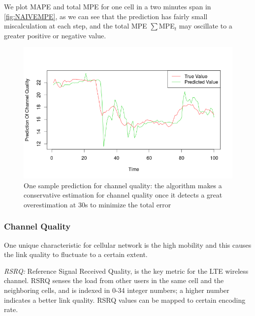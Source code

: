 We plot MAPE and total MPE for one cell in a two minutes span in \autoref{fig:NAIVEMPE}, as we can see that the prediction has fairly small miscalculation at each step, and the total MPE $\sum$MPE$_t$ may oscillate to a greater positive or negative value. 
\begin{figure}[t]
\centering
 \includegraphics[width=0.8\linewidth]{pictures/prediction.png}
\caption{One sample prediction for channel quality: the algorithm makes a conservative estimation for channel quality once  it detects a great overestimation at 30s to minimize the total error} \label{fig:prediction}
\end{figure}
\subsubsection{Channel Quality}\label{subsec:CQ}
One unique characteristic for cellular network is the high mobility and this causes the link quality to fluctuate to a certain extent.

\emph{RSRQ:} Reference Signal Received Quality, is the key metric for the LTE wireless channel. RSRQ senses the load from other users in the same cell and the neighboring cells, and is indexed in 0-34 integer numbers; a higher number indicates a better link quality. RSRQ values can be mapped to certain encoding rate.

